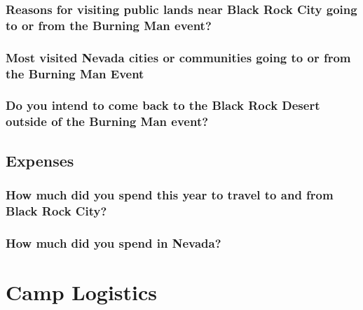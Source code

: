 \documentclass[
]{book}
\begin{document}
\hypertarget{reasons-for-visiting-public-lands-near-black-rock-city-going-to-or-from-the-burning-man-event}{%
\subsection{Reasons for visiting public lands near Black Rock City going to or from the Burning Man event?}\label{reasons-for-visiting-public-lands-near-black-rock-city-going-to-or-from-the-burning-man-event}}

\hypertarget{most-visited-nevada-cities-or-communities-going-to-or-from-the-burning-man-event}{%
\subsection{Most visited Nevada cities or communities going to or from the Burning Man Event}\label{most-visited-nevada-cities-or-communities-going-to-or-from-the-burning-man-event}}

\hypertarget{do-you-intend-to-come-back-to-the-black-rock-desert-outside-of-the-burning-man-event}{%
\subsection{Do you intend to come back to the Black Rock Desert outside of the Burning Man event?}\label{do-you-intend-to-come-back-to-the-black-rock-desert-outside-of-the-burning-man-event}}

\hypertarget{expenses}{%
\section{Expenses}\label{expenses}}

\hypertarget{how-much-did-you-spend-this-year-to-travel-to-and-from-black-rock-city}{%
\subsection{How much did you spend this year to travel to and from Black Rock City?}\label{how-much-did-you-spend-this-year-to-travel-to-and-from-black-rock-city}}

\hypertarget{how-much-did-you-spend-in-nevada}{%
\subsection{How much did you spend in Nevada?}\label{how-much-did-you-spend-in-nevada}}

\hypertarget{camp-logistics}{%
\chapter{Camp Logistics}\label{camp-logistics}}
\end{document}
